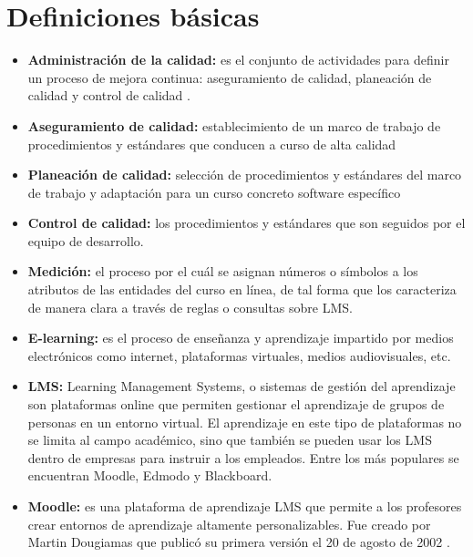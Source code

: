 

\section{Definiciones básicas}

\begin{itemize}
	\item \textbf{Administración de la calidad:} es el conjunto de actividades para definir un proceso de mejora continua: aseguramiento de calidad, planeación de calidad y control de calidad \cite{dolado2000medicion} \cite{Sommerville10}.
	\item \textbf{Aseguramiento de calidad:} establecimiento de un marco de trabajo de procedimientos y estándares que conducen a curso de alta calidad
	\item \textbf{Planeación de calidad:} selección de procedimientos y estándares del
	marco de trabajo y adaptación para un curso concreto software específico
	\item \textbf{Control de calidad:} los procedimientos y estándares que son seguidos por el
	equipo de desarrollo.
	
	\item \textbf{Medición:} el proceso por el cuál se asignan números o símbolos a los atributos de las entidades del
	curso en línea, de tal forma que los caracteriza de manera clara a través de reglas o consultas sobre LMS.
	
	\item \textbf{E-learning:}
	es el proceso de enseñanza y aprendizaje impartido por medios electrónicos como internet, plataformas virtuales, medios audiovisuales, etc.
	\item \textbf{LMS:}
	Learning Management Systems, o sistemas de gestión del aprendizaje son plataformas online que permiten gestionar el aprendizaje de grupos de personas en un entorno virtual. El aprendizaje en este tipo de plataformas no se limita al campo académico, sino que también se pueden usar los LMS dentro de empresas para instruir a los empleados. Entre los más populares se encuentran Moodle, Edmodo y Blackboard.
	\item \textbf{Moodle:}
	es una plataforma de aprendizaje LMS que permite a los profesores crear entornos de aprendizaje altamente personalizables. Fue creado por Martin Dougiamas que publicó su primera versión el 20 de agosto de 2002 \cite{dougiamas2002interpretive}.
\end{itemize}


